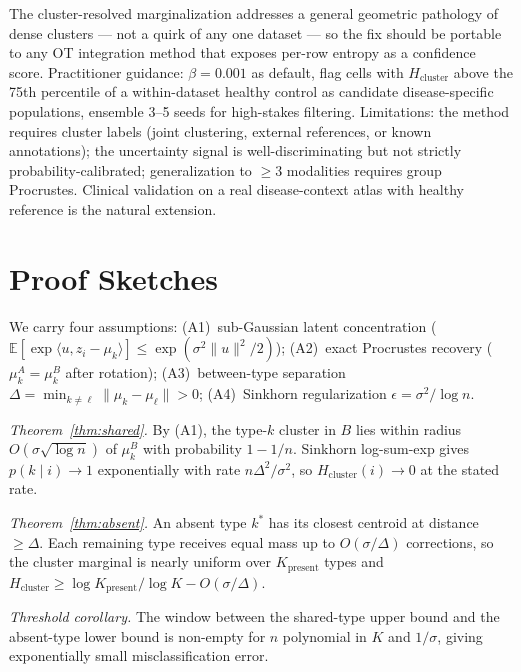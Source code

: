 \documentclass{article}
\theoremstyle{plain}
\newcommand{\Hcluster}{H_{\text{cluster}}}
\begin{document}
The cluster-resolved marginalization addresses a general geometric pathology of dense clusters --- not a quirk of any one dataset --- so the fix should be portable to any OT integration method that exposes per-row entropy as a confidence score. Practitioner guidance: $\beta=0.001$ as default, flag cells with $\Hcluster$ above the 75th percentile of a within-dataset healthy control as candidate disease-specific populations, ensemble 3--5 seeds for high-stakes filtering. Limitations: the method requires cluster labels (joint clustering, external references, or known annotations); the uncertainty signal is well-discriminating but not strictly probability-calibrated; generalization to $\geq 3$ modalities requires group Procrustes. Clinical validation on a real disease-context atlas with healthy reference is the natural extension.




\newpage
\appendix
\onecolumn

\section{Proof Sketches}
\label{app:proofs}

We carry four assumptions: (A1)~sub-Gaussian latent concentration ($\mathbb{E}[\exp\langle u, z_i-\mu_k\rangle]\leq\exp(\sigma^2\|u\|^2/2)$); (A2)~exact Procrustes recovery ($\mu_k^A=\mu_k^B$ after rotation); (A3)~between-type separation $\Delta=\min_{k\neq\ell}\|\mu_k-\mu_\ell\|>0$; (A4)~Sinkhorn regularization $\epsilon=\sigma^2/\log n$.

\textit{Theorem~\ref{thm:shared}.} By (A1), the type-$k$ cluster in $B$ lies within radius $O(\sigma\sqrt{\log n})$ of $\mu_k^B$ with probability $1-1/n$. Sinkhorn log-sum-exp gives $p(k\mid i)\to 1$ exponentially with rate $n\Delta^2/\sigma^2$, so $\Hcluster(i)\to 0$ at the stated rate.

\textit{Theorem~\ref{thm:absent}.} An absent type $k^*$ has its closest centroid at distance $\geq \Delta$. Each remaining type receives equal mass up to $O(\sigma/\Delta)$ corrections, so the cluster marginal is nearly uniform over $K_{\text{present}}$ types and $\Hcluster\geq \log K_{\text{present}}/\log K - O(\sigma/\Delta)$.

\textit{Threshold corollary.} The window between the shared-type upper bound and the absent-type lower bound is non-empty for $n$ polynomial in $K$ and $1/\sigma$, giving exponentially small misclassification error.
\end{document}
